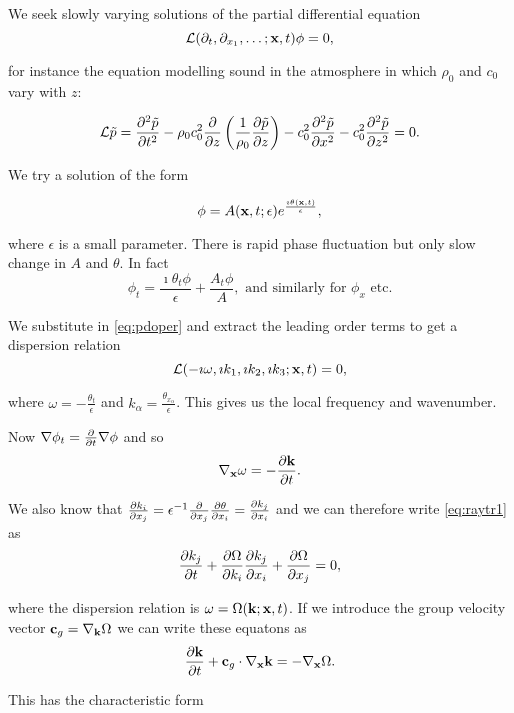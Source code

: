 \documentclass{notes}
\newcommand{\vk}{\vect{k}}
\newcommand{\cL}{\mathcal{L}}
\begin{document}
We seek slowly varying solutions of the partial differential equation
\begin{equation}\label{eq:pdoper}
\cL(\partial_t,\partial_{x_1}, \dots ; \vx,t) \phi = 0,
\end{equation}

for instance the equation modelling sound in the atmosphere in
which $\rho_0$ and $c_0$ vary with $z$:

\[
\cL \Tilde{p} = \pd{^2 \Tilde{p}}{t^2}
- \rho_0 c_0^2 \pd{}{z} \left( \frac{1}{\rho_0} \pd{\Tilde{p}}{z}\right)
- c_0^2 \pd{^2 \Tilde{p}}{x^2} - c_0^2 \pd{^2 \Tilde{p}}{z^2} = 0.
\]

We try a solution of the form

\begin{equation}\label{eq:pdetrial}
\phi = A(\mathbf{x},t;\epsilon) e^{\frac{\imath \theta(\mathbf{x},t)}{\epsilon}},
\end{equation}

where $\epsilon$ is a small parameter.  There is rapid phase fluctuation
but only slow change in $A$ and $\theta$.  In fact
\[
\phi_t = \frac{\imath \theta_t \phi}{\epsilon}
+ \frac{A_t \phi}{A}, \text{ and similarly for $\phi_x$ etc.}
\]

We substitute in \eqref{eq:pdoper} and extract the leading order terms
to get a dispersion relation
\begin{equation}\label{eq:raydisperse}
\cL(-\imath \omega, \imath k_1, \imath k_2, \imath k_3;\vx,t) = 0,
\end{equation}

where $\omega = - \frac{\theta_t}{\epsilon}$ and
$k_\alpha = \frac{\theta_{x_\alpha}}{\epsilon}$.  This gives
us the local frequency and wavenumber.

Now $\nabla \phi_t = \frac{\partial }{\partial t}\nabla \phi$ and so
\begin{equation}\label{eq:raytr1}
\nabla_\vx \omega = -\pddt{\vk}.
\end{equation}

We also know that $\frac{\partial k_i}{\partial x_j} = \epsilon^{-1} \frac{\partial }{\partial x_j}
\frac{\partial \theta}{\partial x_i} = \frac{\partial k_j}{\partial x_i}$ and we can therefore write 
\eqref{eq:raytr1} as
\[
\frac{\partial k_j}{\partial t} + \frac{\partial \Omega}{\partial k_i} \frac{\partial k_j}{\partial x_i} + \frac{\partial \Omega}{\partial x_j} = 0,
\]

where the dispersion relation is $\omega = \Omega(\vk;\vx,t)$.  If
we introduce the group velocity vector $\vect{c}_g = \nabla_\vk \Omega$
we can write these equatons as
\[
\pddt{\vk} + \vect{c}_g \cdot \nabla_\vx \vk = - \nabla_\vx \Omega.
\]

This has the characteristic form
\end{document}
